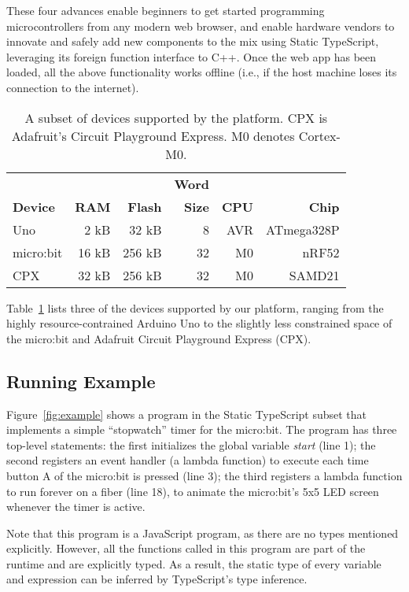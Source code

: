 These four advances enable beginners to get started programming microcontrollers from 
any modern web browser, and enable hardware vendors to innovate and safely add new 
components to the mix using Static TypeScript, leveraging its
foreign function interface to C++.
Once the web app has been loaded, all the above functionality works offline 
(i.e., if the host machine loses its connection
to the internet). 

\begin{table}[]
\centering
\begin{tabular}{|l|r|r|r|r|r|}
\hline
            &          &            & \bf{Word} &          &             \\
\bf{Device} & \bf{RAM} & \bf{Flash} & \bf{Size} & \bf{CPU} & \bf{Chip}   \\ \hline
Uno         & 2 kB     & 32 kB      & 8         & AVR      & ATmega328P  \\ \hline
micro:bit   & 16 kB    & 256 kB     & 32        & M0       & nRF52       \\ \hline
CPX         & 32 kB    & 256 kB     & 32        & M0       & SAMD21      \\ \hline
\end{tabular}
\caption{\label{table:devices}A subset of devices supported by the platform. 
CPX is Adafruit's Circuit Playground Express. M0 denotes Cortex-M0.}
\end{table}
      
Table~\ref{table:devices} lists three of the devices supported by our platform, ranging
from the highly resource-contrained Arduino Uno to the slightly less constrained space of
the micro:bit and Adafruit Circuit Playground Express (CPX).


\subsection{Running Example}

Figure~\ref{fig:example} shows a program in the Static
TypeScript subset that implements a simple ``stopwatch'' timer
for the micro:bit.
The program has three top-level statements:
the first initializes the global variable \emph{start} (line 1); the
second registers an event handler (a lambda function) to execute
each time button A of the micro:bit is pressed (line 3); the
third registers a lambda function to run forever on a fiber (line 18),
to animate the micro:bit's 5x5 LED screen whenever the timer is active. 

Note that this program is a JavaScript program, as there are no 
types mentioned explicitly. However, all the functions called in
this program are part of the runtime and are explicitly
typed.  As a result, the static type of every variable and expression
can be inferred by TypeScript's type inference.

